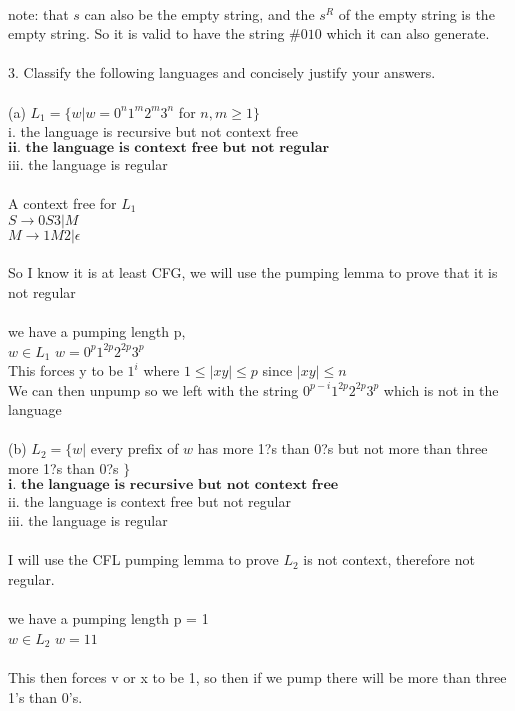 \documentclass[11pt, oneside]{article}   	%
\begin{document}
\\note: that $s$ can also be the empty string, and the $s^R$ of the empty string is the empty string. So it is valid to have the string $\# 010$ which it can also generate.
\\
\\3. Classify the following languages and concisely justify your answers.
\\
\\(a) $L_1 = \{ w | w = 0^n1^m2^m3^n$ for $ n,m \ge 1 \}$
\\i. the language is recursive but not context free
\\$\textbf{ii. the language is context free but not regular}$
\\iii. the language is regular
\\
\\A context free for $L_1$
\\$S \rightarrow 0S3 | M$
\\$M \rightarrow 1M2 | \epsilon$
\\
\\ So I know it is at least CFG, we will use the pumping lemma to prove that it is not regular
\\
\\we have a pumping length p,
\\$w \in L_1$ $w = 0^p1^{2p}2^{2p}3^p$
\\This forces y to be $1^i$ where $1 \le |xy| \le p$ since $|xy| \le n$
\\We can then unpump so we left with the string $0^{p - i}1^{2p}2^{2p}3^p$ which is not in the language
\\
\\(b) $L_2 = \{ w |$ every prefix of $w$ has more 1?s than 0?s but not more than three more 1?s than 0?s $\}$
\\$\textbf{i. the language is recursive but not context free}$
\\ii. the language is context free but not regular
\\iii. the language is regular
\\
\\I will use the CFL pumping lemma to prove $L_2$ is not context, therefore not regular.
\\
\\we have a pumping length p = 1
\\$w \in L_2$ $w = 11$
\\
\\This then forces v or x to be 1, so then if we pump there will be more than three 1's than 0's.
\end{document}
